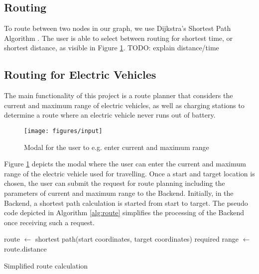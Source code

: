 \documentclass[a4paper]{article}
\begin{document}
\subsection{Routing}
To route between two nodes in our graph, we use Dijkstra's Shortest Path Algorithm \cite{Dijkstra1959}.
The user is able to select between routing for shortest time, or shortest distance, as visible in Figure \ref{fig:input}.
TODO: explain distance/time
\subsection{Routing for Electric Vehicles}
The main functionality of this project is a route planner that considers the current and maximum range of electric vehicles, as well as charging stations to determine a route where an electric vehicle never runs out of battery.
\begin{figure}[h]
    \centering
    \texttt{[image: figures/input]}
    \caption{Modal for the user to e.g. enter current and maximum range}
    \label{fig:input}
\end{figure}
Figure \ref{fig:input} depicts the modal where the user can enter the current and maximum range of the electric vehicle used for travelling.
Once a start and target location is chosen, the user can submit the request for route planning including the parameters of current and maximum range to the Backend.
Initially, in the Backend, a shortest path calculation is started from start to target.
The pseudo code depicted in Algorithm \ref{alg:route} simplifies the processing of the Backend once receiving such a request.\par\bigskip
\begin{algorithm}[H]
route $\leftarrow$  shortest path(start coordinates, target coordinates)\;
required range $\leftarrow$ route.distance\;
 \caption{Simplified route calculation}
 \label{alg:route}
\end{algorithm}\par\bigskip
\end{document}
